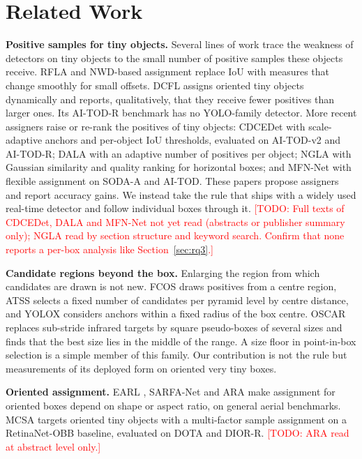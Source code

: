 \documentclass[11pt]{article}
\newcommand{\todo}[1]{\textcolor{red}{[TODO: #1]}}
\begin{document}
\section{Related Work}
\textbf{Positive samples for tiny objects.} Several lines of work trace the weakness of detectors on tiny objects to the
small number of positive samples these objects receive. RFLA \cite{rfla} and NWD-based assignment \cite{aitodv2} replace IoU
with measures that change smoothly for small offsets. DCFL \cite{aitodr} assigns oriented tiny objects dynamically and
reports, qualitatively, that they receive fewer positives than larger ones. Its AI-TOD-R benchmark has no YOLO-family
detector. More recent assigners raise or re-rank the positives of tiny objects: CDCEDet \cite{cdcedet} with scale-adaptive
anchors and per-object IoU thresholds, evaluated on AI-TOD-v2 and AI-TOD-R; DALA \cite{dala} with an adaptive number of
positives per object; NGLA \cite{ngla} with Gaussian similarity and quality ranking for horizontal boxes; and MFN-Net
\cite{mfnnet} with flexible assignment on SODA-A and AI-TOD. These papers propose assigners and report accuracy gains. We
instead take the rule that ships with a widely used real-time detector and follow individual boxes through it.
\todo{Full texts of CDCEDet, DALA and MFN-Net not yet read (abstracts or publisher summary only); NGLA read by section
structure and keyword search. Confirm that none reports a per-box analysis like Section~\ref{sec:rq3}.}

\textbf{Candidate regions beyond the box.} Enlarging the region from which candidates are drawn is not new. FCOS \cite{fcos}
draws positives from a centre region, ATSS \cite{atss} selects a fixed number of candidates per pyramid level by centre
distance, and YOLOX \cite{yolox} considers anchors within a fixed radius of the box centre. OSCAR \cite{oscar} replaces
sub-stride infrared targets by square pseudo-boxes of several sizes and finds that the best size lies in the middle of
the range. A size floor in point-in-box selection is a simple member of this family. Our contribution is not the rule but
measurements of its deployed form on oriented very tiny boxes.

\textbf{Oriented assignment.} EARL \cite{earl}, SARFA-Net \cite{sarfa} and ARA \cite{ara} make assignment for oriented boxes
depend on shape or aspect ratio, on general aerial benchmarks. MCSA \cite{mcsa} targets oriented tiny objects with a
multi-factor sample assignment on a RetinaNet-OBB baseline, evaluated on DOTA and DIOR-R. \todo{ARA read at abstract level
only.}
\end{document}
